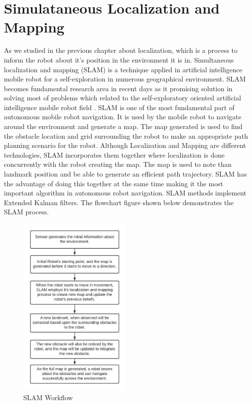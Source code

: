 \section{Simulataneous Localization and Mapping}
As we studied in the previous chapter about localization, which is a process to inform the robot about it's position in the environment it is in. 
Simultaneous localization and mapping (SLAM)
is a technique applied in artificial intelligence mobile robot for
a self-exploration in numerous geographical environment.
SLAM becomes fundamental research area in recent days as it
promising solution in solving most of problems which related
to the self-exploratory oriented artificial intelligence mobile
robot field \cite{7482163}. SLAM is one of the most fundamental part of autonomous mobile robot navigation. It is used by the mobile robot to navigate around the environment 
and generate a map. The map generated is used to find the obstacle location and grid surrounding the robot to make an appropriate path planning scenario for the robot.
Although Localization and Mapping are different technologies, SLAM incorporates them together where localization is done concurrently with the robot creating the map.
The map is used to note than landmark position and be able to generate an efficient path trajectory. SLAM has the advantage of doing this together at the same time making it the most important 
algorithm in autonomous robot navigation. SLAM methods implement Extended Kalman filters. The flowchart figure shown below demonstrates the SLAM process.
\begin{figure}[th]
    \centering
    \includegraphics[width=0.5\textwidth]{Figures/SLAM_flowchart.jpeg}
    \decoRule
    \caption[]{SLAM Workflow \cite{7482163}}
    \label{fig:SLAMFlowchart}
\end{figure}

